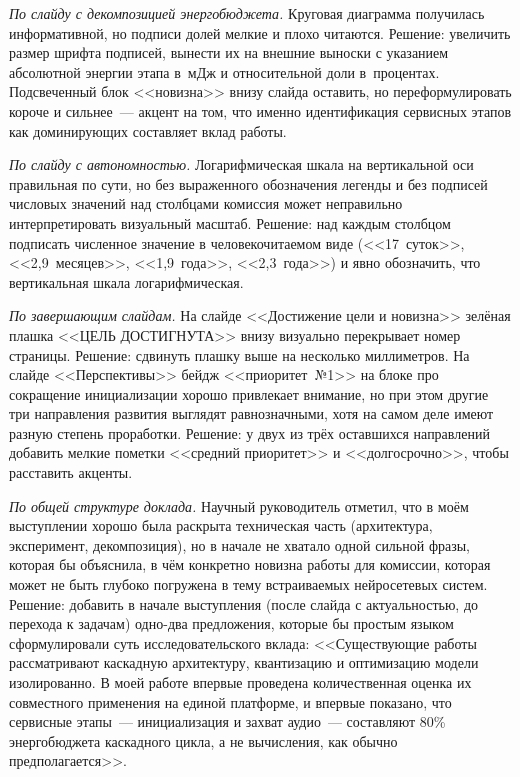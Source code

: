 \textit{По слайду с декомпозицией энергобюджета.} Круговая
диаграмма получилась информативной, но подписи долей мелкие
и плохо читаются. Решение: увеличить размер шрифта подписей,
вынести их на внешние выноски с указанием абсолютной энергии
этапа в~мДж и относительной доли в~процентах. Подсвеченный
блок <<новизна>> внизу слайда оставить, но переформулировать
короче и сильнее~--- акцент на том, что именно идентификация
сервисных этапов как доминирующих составляет вклад работы.

\textit{По слайду с автономностью.} Логарифмическая шкала на
вертикальной оси правильная по сути, но без выраженного
обозначения легенды и без подписей числовых значений над
столбцами комиссия может неправильно интерпретировать
визуальный масштаб. Решение: над каждым столбцом подписать
численное значение в человекочитаемом виде (<<17~суток>>,
<<2,9~месяцев>>, <<1,9~года>>, <<2,3~года>>) и явно
обозначить, что вертикальная шкала логарифмическая.

\textit{По завершающим слайдам.} На слайде <<Достижение цели
и новизна>> зелёная плашка <<ЦЕЛЬ ДОСТИГНУТА>> внизу
визуально перекрывает номер страницы. Решение: сдвинуть
плашку выше на несколько миллиметров. На слайде
<<Перспективы>> бейдж <<приоритет~№1>> на блоке про
сокращение инициализации хорошо привлекает внимание, но при
этом другие три направления развития выглядят равнозначными,
хотя на самом деле имеют разную степень проработки. Решение:
у двух из трёх оставшихся направлений добавить мелкие
пометки <<средний приоритет>> и <<долгосрочно>>, чтобы
расставить акценты.

\textit{По общей структуре доклада.} Научный руководитель
отметил, что в моём выступлении хорошо была раскрыта
техническая часть (архитектура, эксперимент, декомпозиция),
но в начале не хватало одной сильной фразы, которая бы
объяснила, в чём конкретно новизна работы для комиссии,
которая может не быть глубоко погружена в тему встраиваемых
нейросетевых систем. Решение: добавить в начале выступления
(после слайда с актуальностью, до перехода к задачам)
одно-два предложения, которые бы простым языком сформулировали
суть исследовательского вклада: <<Существующие работы
рассматривают каскадную архитектуру, квантизацию и
оптимизацию модели изолированно. В моей работе впервые
проведена количественная оценка их совместного применения
на единой платформе, и впервые показано, что сервисные
этапы~--- инициализация и захват аудио~--- составляют 80\%
энергобюджета каскадного цикла, а не вычисления, как
обычно предполагается>>.

